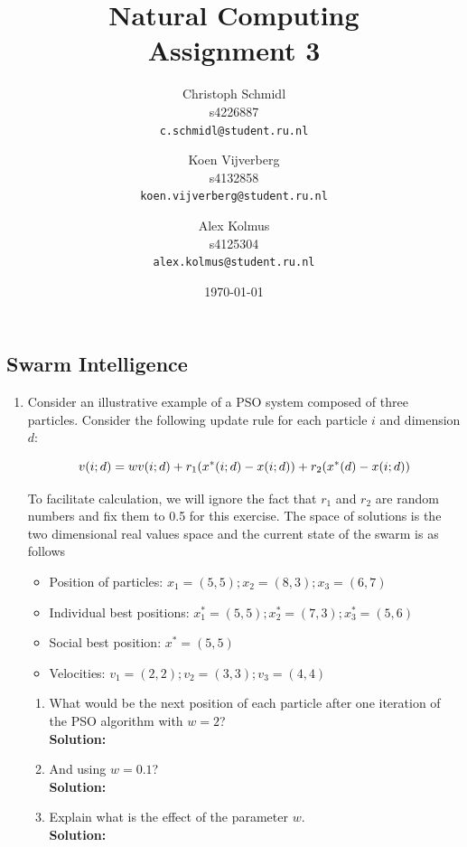 \documentclass[a4paper]{article}
\title{Natural Computing\\Assignment 3}
\author{
  Christoph Schmidl\\ s4226887\\      \texttt{c.schmidl@student.ru.nl}
  \and
  Koen Vijverberg\\ s4132858\\     \texttt{koen.vijverberg@student.ru.nl}
  \and
  Alex Kolmus\\	s4125304\\	\texttt{alex.kolmus@student.ru.nl}
}
\date{\today}
\begin{document}
\maketitle


\subsection*{Swarm Intelligence}

\begin{enumerate}

	\item Consider an illustrative example of a PSO system composed of three particles. Consider the following update rule for each particle $i$ and dimension $d$:
	
	\begin{equation}
		v(i;d) = wv(i;d) + r_1(x^*(i;d) - x(i;d)) + r_2(x^*(d) - x(i;d)) \notag
	\end{equation}

To facilitate calculation, we will ignore the fact that $r_1$ and $r_2$ are random numbers and fix them to 0.5 for this exercise. The space of solutions is the two dimensional real values space and the current state of the swarm is as follows

\begin{itemize}
	\item Position of particles: $x_1 = (5,5); x_2 = (8,3); x_3 = (6,7)$
	\item Individual best positions: $x^*_1 = (5,5); x^*_2 = (7,3); x^*_3 = (5,6)$
	\item Social best position: $x^* = (5,5)$
	\item Velocities: $v_1 = (2,2); v_2 = (3,3); v_3 = (4,4)$
\end{itemize}

\begin{enumerate}
	\item What would be the next position of each particle after one iteration of the PSO algorithm with $w = 2$?\\
	\textbf{Solution:}\\
	
	\item And using $w = 0.1$?\\
	\textbf{Solution:}\\
	
	\item Explain what is the effect of the parameter $w$.\\
	\textbf{Solution:}\\
	

\end{enumerate}
\end{enumerate}
\end{document}
